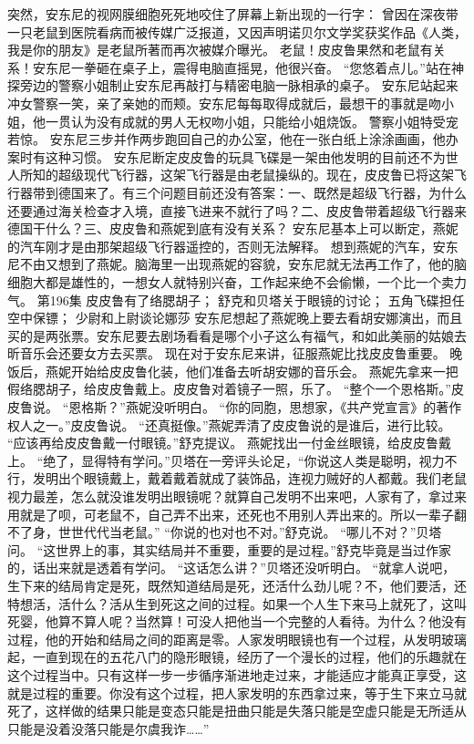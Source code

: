 \documentclass[a4paper,12pt,UTF8,twoside]{ctexbook}
\begin{document}
        突然，安东尼的视网膜细胞死死地咬住了屏幕上新出现的一行字： 
        曾因在深夜带一只老鼠到医院看病而被传媒广泛报道，又因声明诺贝尔文学奖获奖作品《人类，我是你的朋友》是老鼠所著而再次被媒介曝光。 
        老鼠！皮皮鲁果然和老鼠有关系！安东尼一拳砸在桌子上，震得电脑直摇晃，他很兴奋。 
        “您悠着点儿。”站在神探旁边的警察小姐制止安东尼再敲打与精密电脑一脉相承的桌子。 
        安东尼站起来冲女警察一笑，亲了亲她的而颊。安东尼每每取得成就后，最想干的事就是吻小姐，他一贯认为没有成就的男人无权吻小姐，只能给小姐烧饭。 
        警察小姐特受宠若惊。 
        安东尼三步并作两步跑回自己的办公室，他在一张白纸上涂涂画画，他办案时有这种习惯。 
        安东尼断定皮皮鲁的玩具飞碟是一架由他发明的目前还不为世人所知的超级现代飞行器，这架飞行器是由老鼠操纵的。现在，皮皮鲁已将这架飞行器带到德国来了。有三个问题目前还没有答案：一、既然是超级飞行器，为什么还要通过海关检查才入境，直接飞进来不就行了吗？二、皮皮鲁带着超级飞行器来德国干什么？三、皮皮鲁和燕妮到底有没有关系？ 
        安东尼基本上可以断定，燕妮的汽车刚才是由那架超级飞行器遥控的，否则无法解释。 
        想到燕妮的汽车，安东尼不由又想到了燕妮。脑海里一出现燕妮的容貌，安东尼就无法再工作了，他的脑细胞大都是雄性的，一想女人就特别兴奋，工作起来绝不会偷懒，一个比一个卖力气。   第196集 
        皮皮鲁有了络腮胡子； 
        舒克和贝塔关于眼镜的讨论； 
        五角飞碟担任空中保镖； 
        少尉和上尉谈论娜莎 
        安东尼想起了燕妮晚上要去看胡安娜演出，而且买的是两张票。安东尼要去剧场看看是哪个小子这么有福气，和如此美丽的姑娘去昕音乐会还要女方去买票。 
        现在对于安东尼来讲，征服燕妮比找皮皮鲁重要。 
        晚饭后，燕妮开始给皮皮鲁化装，他们准备去听胡安娜的音乐会。 
        燕妮先拿来一把假络腮胡子，给皮皮鲁戴上。皮皮鲁对着镜子一照，乐了。 
        “整个一个恩格斯。”皮皮鲁说。 
        “恩格斯？”燕妮没听明白。 
        “你的同胞，思想家，《共产党宣言》的著作权人之一。”皮皮鲁说。 
        “还真挺像。”燕妮弄清了皮皮鲁说的是谁后，进行比较。 
        “应该再给皮皮鲁戴一付眼镜。”舒克提议。 
        燕妮找出一付金丝眼镜，给皮皮鲁戴上。 
        “绝了，显得特有学问。”贝塔在一旁评头论足，“你说这人类是聪明，视力不行，发明出个眼镜戴上，戴着戴着就成了装饰品，连视力贼好的人都戴。我们老鼠视力最差，怎么就没谁发明出眼镜呢？就算自己发明不出来吧，人家有了，拿过来用就是了呗，可老鼠不，自己弄不出来，还死也不用别人弄出来的。所以一辈子翻不了身，世世代代当老鼠。” 
        “你说的也对也不对。”舒克说。 
        “哪儿不对？”贝塔问。 
        “这世界上的事，其实结局并不重要，重要的是过程。”舒克毕竟是当过作家的，话出来就是透着有学问。 
        “这话怎么讲？”贝塔还没听明白。 
        “就拿人说吧，生下来的结局肯定是死，既然知道结局是死，还活什么劲儿呢？不，他们要活，还特想活，活什么？活从生到死这之间的过程。如果一个人生下来马上就死了，这叫死婴，他算不算人呢？当然算！可没人把他当一个完整的人看待。为什么？他没有过程，他的开始和结局之间的距离是零。人家发明眼镜也有一个过程，从发明玻璃起，一直到现在的五花八门的隐形眼镜，经历了一个漫长的过程，他们的乐趣就在这个过程当中。只有这样一步一步循序渐进地走过来，才能适应才能真正享受，这就是过程的重要。你没有这个过程，把人家发明的东西拿过来，等于生下来立马就死了，这样做的结果只能是变态只能是扭曲只能是失落只能是空虚只能是无所适从只能是没着没落只能是尔虞我诈……” 
\end{document}
